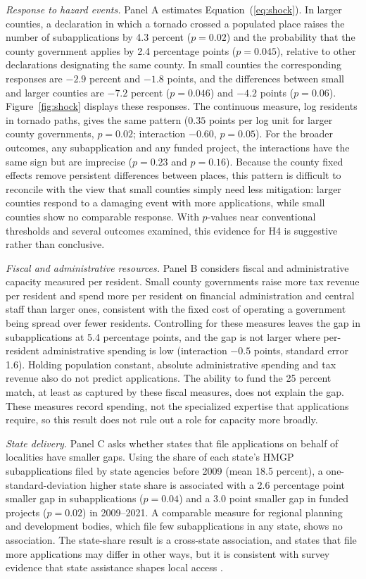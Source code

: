 \textit{Response to hazard events.} Panel A estimates Equation~(\ref{eq:shock}). In larger counties, a declaration in which a tornado crossed a populated place raises the number of subapplications by 4.3 percent ($p = 0.02$) and the probability that the county government applies by 2.4 percentage points ($p = 0.045$), relative to other declarations designating the same county. In small counties the corresponding responses are $-2.9$ percent and $-1.8$ points, and the differences between small and larger counties are $-7.2$ percent ($p = 0.046$) and $-4.2$ points ($p = 0.06$). Figure~\ref{fig:shock} displays these responses. The continuous measure, log residents in tornado paths, gives the same pattern ($0.35$ points per log unit for larger county governments, $p = 0.02$; interaction $-0.60$, $p = 0.05$). For the broader outcomes, any subapplication and any funded project, the interactions have the same sign but are imprecise ($p = 0.23$ and $p = 0.16$). Because the county fixed effects remove persistent differences between places, this pattern is difficult to reconcile with the view that small counties simply need less mitigation: larger counties respond to a damaging event with more applications, while small counties show no comparable response. With $p$-values near conventional thresholds and several outcomes examined, this evidence for H4 is suggestive rather than conclusive.

\textit{Fiscal and administrative resources.} Panel B considers fiscal and administrative capacity measured per resident. Small county governments raise more tax revenue per resident and spend more per resident on financial administration and central staff than larger ones, consistent with the fixed cost of operating a government being spread over fewer residents. Controlling for these measures leaves the gap in subapplications at 5.4 percentage points, and the gap is not larger where per-resident administrative spending is low (interaction $-0.5$ points, standard error 1.6). Holding population constant, absolute administrative spending and tax revenue also do not predict applications. The ability to fund the 25 percent match, at least as captured by these fiscal measures, does not explain the gap. These measures record spending, not the specialized expertise that applications require, so this result does not rule out a role for capacity more broadly.

\textit{State delivery.} Panel C asks whether states that file applications on behalf of localities have smaller gaps. Using the share of each state's HMGP subapplications filed by state agencies before 2009 (mean 18.5 percent), a one-standard-deviation higher state share is associated with a 2.6 percentage point smaller gap in subapplications ($p = 0.04$) and a 3.0 point smaller gap in funded projects ($p = 0.02$) in 2009--2021. A comparable measure for regional planning and development bodies, which file few subapplications in any state, shows no association. The state-share result is a cross-state association, and states that file more applications may differ in other ways, but it is consistent with survey evidence that state assistance shapes local access \parencite{smith2020state}.

